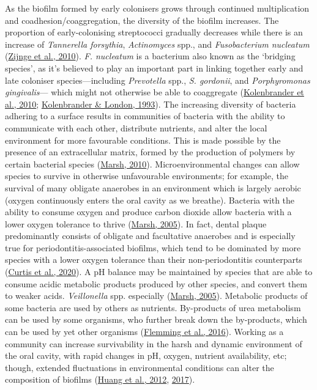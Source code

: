 \documentclass[
  b5paper,
]{book}
\begin{document}
As the biofilm formed by early colonisers grows through continued
multiplication and coadhesion/coaggregation, the diversity of the
biofilm increases. The proportion of early-colonising streptococci
gradually decreases while there is an increase of \emph{Tannerella
forsythia}, \emph{Actinomyces} spp., and \emph{Fusobacterium nucleatum}
(\protect\hyperlink{ref-zijngeBiofilmArchitecture2010}{Zijnge et al.,
2010}). \emph{F. nucleatum} is a bacterium also known as the `bridging
species', as it's believed to play an important part in linking together
early and late coloniser species---including \emph{Prevotella} spp.,
\emph{S. gordonii}, and \emph{Porphyromonas gingivalis}--- which might
not otherwise be able to coaggregate
(\protect\hyperlink{ref-kolenbranderOralMultispecies2010}{Kolenbrander
et al., 2010};
\protect\hyperlink{ref-kolenbranderAdhereToday1993}{Kolenbrander \&
London, 1993}). The increasing diversity of bacteria adhering to a
surface results in communities of bacteria with the ability to
communicate with each other, distribute nutrients, and alter the local
environment for more favourable conditions. This is made possible by the
presence of an extracellular matrix, formed by the production of
polymers by certain bacterial species
(\protect\hyperlink{ref-marshMicrobiologyDental2010}{Marsh, 2010}).
Microenvironmental changes can allow species to survive in otherwise
unfavourable environments; for example, the survival of many obligate
anaerobes in an environment which is largely aerobic (oxygen
continuously enters the oral cavity as we breathe). Bacteria with the
ability to consume oxygen and produce carbon dioxide allow bacteria with
a lower oxygen tolerance to thrive
(\protect\hyperlink{ref-marshDentalPlaque2005}{Marsh, 2005}). In fact,
dental plaque predominantly consists of obligate and facultative
anaerobes and is especially true for periodontitis-associated biofilms,
which tend to be dominated by more species with a lower oxygen tolerance
than their non-periodontitis counterparts
(\protect\hyperlink{ref-curtisRoleMicrobiota2020}{Curtis et al., 2020}).
A pH balance may be maintained by species that are able to consume
acidic metabolic products produced by other species, and convert them to
weaker acids. \emph{Veillonella} spp. especially
(\protect\hyperlink{ref-marshDentalPlaque2005}{Marsh, 2005}). Metabolic
products of some bacteria are used by others as nutrients. By-products
of urea metabolism can be used by some organisms, who further break down
the by-products, which can be used by yet other organisms
(\protect\hyperlink{ref-flemmingBiofilmsEmergent2016}{Flemming et al.,
2016}). Working as a community can increase survivability in the harsh
and dynamic environment of the oral cavity, with rapid changes in pH,
oxygen, nutrient availability, etc; though, extended fluctuations in
environmental conditions can alter the composition of biofilms
(\protect\hyperlink{ref-huangFactorsAssociated2012}{Huang et al., 2012},
\protect\hyperlink{ref-huangEffectArginine2017}{2017}).
\end{document}
